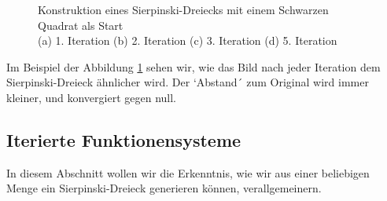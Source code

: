 \begin{figure}	
	\centering
	\caption{Konstruktion eines Sierpinski-Dreiecks mit einem Schwarzen Quadrat als Start\\
		(a) 1. Iteration (b) 2. Iteration (c) 3. Iteration (d) 5. Iteration}
	\label{ifs:sierpconst}
\end{figure}
Im Beispiel der Abbildung \ref{ifs:sierpconst} sehen wir, wie das Bild nach jeder Iteration dem Sierpinski-Dreieck ähnlicher wird.
Der `Abstand´ zum Original wird immer kleiner, und konvergiert gegen null.

\subsection{Iterierte Funktionensysteme
\label{ifs:subsection:IteratedFunktionensysteme}}
In diesem Abschnitt wollen wir die Erkenntnis, wie wir aus einer beliebigen Menge ein Sierpinski-Dreieck generieren können, verallgemeinern.


